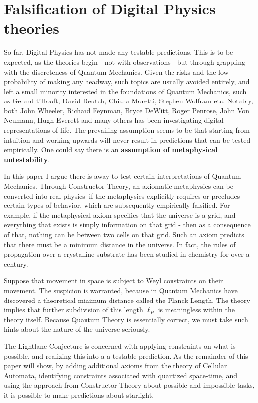 \documentclass[notitlepage]{article}
\begin{document}
\section{Falsification of Digital Physics theories}
So far, Digital Physics has not made any testable predictions. This is to be expected, as the theories begin - not with observations - but through grappling with the discreteness of Quantum Mechanics. Given the risks and the low probability of making any headway, such topics are usually avoided entirely, and left a small minority interested in the foundations of Quantum Mechanics, such as Gerard t'Hooft, David Deutch, Chiara Moretti, Stephen Wolfram etc. Notably, both John Wheeler, Richard Feynman, Bryce DeWitt, Roger Penrose, John Von Neumann, Hugh Everett and many others has been investigating digital representations of life. The prevailing assumption seems to be that starting from intuition and working upwards will never result in predictions that can be tested empirically. One could say there is an \textbf{assumption of metaphysical untestability}. 

In this paper I  argue there is away to test certain interpretations of Quantum Mechanics. Through Constructor Theory, an axiomatic metaphysics can be converted into real physics, if the metaphysics explicitly requires or precludes certain types of behavior, which are subsequently empirically falsified. For example, if the metaphysical axiom specifies that the universe is a grid, and everything that exists is simply information on that grid - then as a consequence of that, nothing can be between two cells on that grid. Such an axiom predicts that there must be a minimum distance in the universe. In fact, the rules of propagation over a crystalline substrate has been studied in chemistry for over a century.  

Suppose that movement in space is subject to Weyl constraints on their movement. The suspicion is warranted, because in Quantum Mechanics have discovered a theoretical minimum distance called the Planck Length.  The theory implies that further subdivision of this length $ \ell_P $ is meaningless within the theory itself. Because Quantum Theory is essentially correct, we must take such hints about the nature of the universe seriously. 

The Lightlane Conjecture is concerned with applying constraints on what is possible, and realizing this into a a testable prediction. As the remainder of this paper will show, by adding additional axioms from the theory of Cellular Automata, identifying constraints associated with quantized space-time, and using the approach from Constructor Theory about possible and impossible tasks, it is possible to make predictions about starlight.
\end{document}
